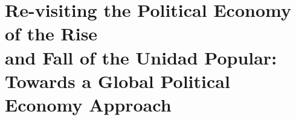 %
%
%

\graphicspath{%
  {Chapter3/}%
  {Chapter3/figures/}%
  {Chapter3/appendix/}%
  {Chapter3/sections/}%
}

\begingroup
\setlength{\parskip}{0.55em}
\setlength{\parindent}{0pt}

\newsavebox{\DissertationFloatBox}
\makeatletter
\let\dissertation@endfloatbox\@endfloatbox
\def\@endfloatbox{%
  \dissertation@endfloatbox
  \ifdim\dimexpr\ht\@currbox+\dp\@currbox\relax>\textheight
    \typeout{DISSERTATION: fitting oversized float to page height}%
    \setbox\DissertationFloatBox\box\@currbox
    \global\setbox\@currbox\vbox{%
      \hbox to\columnwidth{\hfil
        \resizebox*{!}{0.98\textheight}{\usebox{\DissertationFloatBox}}%
      \hfil}}%
  \fi
}
\makeatother

\chapter[Essay 3 \textemdash{} Re-visiting the Political Economy of the Rise and Fall of the Unidad Popular: Towards a Global Political Economy Approach]%
  {Re-visiting the Political Economy of the Rise\\
   and Fall of the Unidad Popular:\\
   Towards a Global Political Economy Approach}

\vspace{0.8em}

